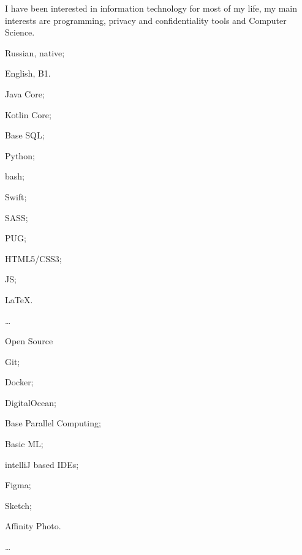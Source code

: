 I have been interested in information technology for most of my life, my main interests are programming, privacy and confidentiality tools and Computer Science.

\Sep




\begin{multicols}{3}
\begin{compactitem}[\color{Cyan}$\circ$]
    \item Russian, native;
    \item English, B1.
\end{compactitem}
\end{multicols}

\SmallSep

\begin{multicols}{3}
\begin{compactitem}[\color{Cyan}$\circ$]
	\item Java Core;
	\item Kotlin Core;
	\item Base SQL;
    \item Python;
    \item bash;
    \item Swift;
    \item SASS;
    \item PUG;
    \item HTML5/CSS3;
    \item JS;
    \item \LaTeX.
    \item \ldots
\end{compactitem}
\end{multicols}

\SmallSep

\begin{multicols}{3}
\begin{compactitem}[\color{Cyan}$\circ$]
    \item Open Source \heart\
    \item Git;
    \item Docker;
    \item DigitalOcean;
    \item Base Parallel Computing;
    \item Basic ML;
    \item intelliJ based IDEs;
    \item Figma;
    \item Sketch;
    \item Affinity Photo.
    \item \ldots
\end{compactitem}
\end{multicols}

